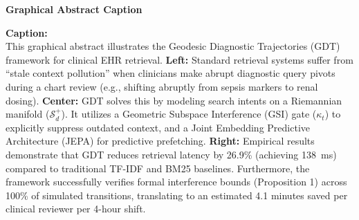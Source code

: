 \documentclass[12pt]{article}
\begin{document}
\begin{center}
    \Large\textbf{Graphical Abstract Caption}
\end{center}
\vspace{1em}

\noindent\textbf{Caption:}\\
This graphical abstract illustrates the Geodesic Diagnostic Trajectories (GDT) framework for clinical EHR retrieval. \textbf{Left:} Standard retrieval systems suffer from ``stale context pollution'' when clinicians make abrupt diagnostic query pivots during a chart review (e.g., shifting abruptly from sepsis markers to renal dosing). \textbf{Center:} GDT solves this by modeling search intents on a Riemannian manifold ($\mathcal{S}_d^+$). It utilizes a Geometric Subspace Interference (GSI) gate ($\kappa_t$) to explicitly suppress outdated context, and a Joint Embedding Predictive Architecture (JEPA) for predictive prefetching. \textbf{Right:} Empirical results demonstrate that GDT reduces retrieval latency by 26.9\% (achieving 138~ms) compared to traditional TF-IDF and BM25 baselines. Furthermore, the framework successfully verifies formal interference bounds (Proposition 1) across 100\% of simulated transitions, translating to an estimated 4.1 minutes saved per clinical reviewer per 4-hour shift.
\end{document}
